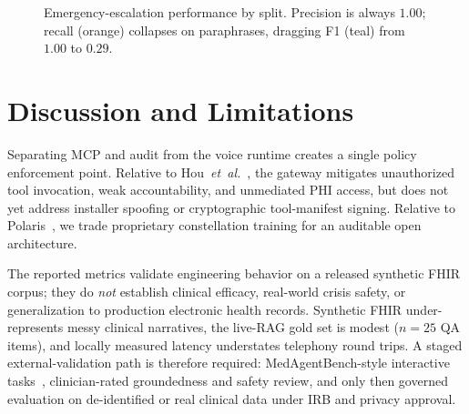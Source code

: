 \documentclass[conference]{IEEEtran}
\begin{document}
\begin{figure}[!t]
\centering
{}
\caption{Emergency-escalation performance by split. Precision is always $1.00$; recall (orange) collapses on paraphrases, dragging F1 (teal) from $1.00$ to $0.29$.}
\label{fig:safetybars}
\end{figure}

\section{Discussion and Limitations}
Separating MCP and audit from the voice runtime creates a single policy enforcement point.
Relative to Hou~\textit{et~al.}~\cite{hou2025mcplandscape}, the gateway mitigates unauthorized tool invocation, weak accountability, and unmediated PHI access, but does not yet address installer spoofing or cryptographic tool-manifest signing.
Relative to Polaris~\cite{mukherjee2024polaris}, we trade proprietary constellation training for an auditable open architecture.

The reported metrics validate engineering behavior on a released synthetic FHIR corpus; they do \emph{not} establish clinical efficacy, real-world crisis safety, or generalization to production electronic health records.
Synthetic FHIR under-represents messy clinical narratives, the live-RAG gold set is modest ($n{=}25$ QA items), and locally measured latency understates telephony round trips.
A staged external-validation path is therefore required: MedAgentBench-style interactive tasks~\cite{jiang2025medagentbench}, clinician-rated groundedness and safety review, and only then governed evaluation on de-identified or real clinical data under IRB and privacy approval.
\end{document}
